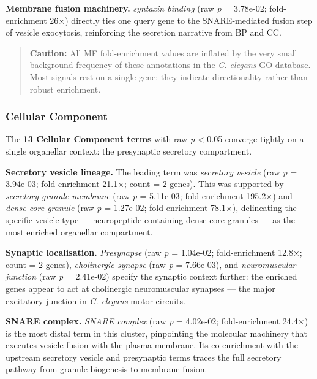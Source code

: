 \documentclass[
  11pt,
]{article}
\begin{document}
\textbf{Membrane fusion machinery.} \emph{syntaxin binding} (raw
\emph{p} = 3.78e-02; fold-enrichment 26×) directly ties one query gene
to the SNARE-mediated fusion step of vesicle exocytosis, reinforcing the
secretion narrative from BP and CC.

\begin{quote}
\textbf{Caution:} All MF fold-enrichment values are inflated by the very
small background frequency of these annotations in the \emph{C. elegans}
GO database. Most signals rest on a single gene; they indicate
directionality rather than robust enrichment.
\end{quote}

\subsubsection{Cellular Component}\label{cellular-component}

The \textbf{13 Cellular Component terms} with raw \emph{p} \textless{}
0.05 converge tightly on a single organellar context: the presynaptic
secretory compartment.

\textbf{Secretory vesicle lineage.} The leading term was \emph{secretory
vesicle} (raw \emph{p} = 3.94e-03; fold-enrichment 21.1×; count = 2
genes). This was supported by \emph{secretory granule membrane} (raw
\emph{p} = 5.11e-03; fold-enrichment 195.2×) and \emph{dense core
granule} (raw \emph{p} = 1.27e-02; fold-enrichment 78.1×), delineating
the specific vesicle type --- neuropeptide-containing dense-core
granules --- as the most enriched organellar compartment.

\textbf{Synaptic localisation.} \emph{Presynapse} (raw \emph{p} =
1.04e-02; fold-enrichment 12.8×; count = 2 genes), \emph{cholinergic
synapse} (raw \emph{p} = 7.66e-03), and \emph{neuromuscular junction}
(raw \emph{p} = 2.41e-02) specify the synaptic context further: the
enriched genes appear to act at cholinergic neuromuscular synapses ---
the major excitatory junction in \emph{C. elegans} motor circuits.

\textbf{SNARE complex.} \emph{SNARE complex} (raw \emph{p} = 4.02e-02;
fold-enrichment 24.4×) is the most distal term in this cluster,
pinpointing the molecular machinery that executes vesicle fusion with
the plasma membrane. Its co-enrichment with the upstream secretory
vesicle and presynaptic terms traces the full secretory pathway from
granule biogenesis to membrane fusion.
\end{document}
